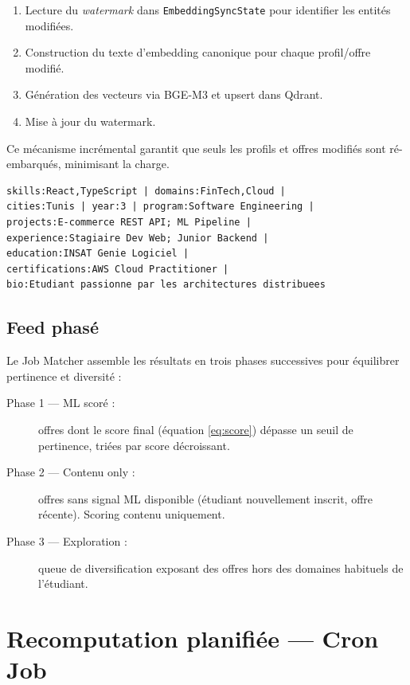 ﻿\documentclass[12pt,a4paper]{report}
\begin{document}
\begin{enumerate}
  \item Lecture du \textit{watermark} dans \texttt{EmbeddingSyncState} pour identifier les entités modifiées.
  \item Construction du texte d'embedding canonique pour chaque profil/offre modifié.
  \item Génération des vecteurs via BGE-M3 et upsert dans Qdrant.
  \item Mise à jour du watermark.
\end{enumerate}

Ce mécanisme incrémental garantit que seuls les profils et offres modifiés sont ré-embarqués, minimisant la charge.

\begin{lstlisting}[style=bash, caption={Format canonique du texte d'embedding étudiant}]
skills:React,TypeScript | domains:FinTech,Cloud |
cities:Tunis | year:3 | program:Software Engineering |
projects:E-commerce REST API; ML Pipeline |
experience:Stagiaire Dev Web; Junior Backend |
education:INSAT Genie Logiciel |
certifications:AWS Cloud Practitioner |
bio:Etudiant passionne par les architectures distribuees
\end{lstlisting}

\subsection{Feed phasé}

Le Job Matcher assemble les résultats en trois phases successives pour équilibrer pertinence et diversité :

\begin{description}
  \item[Phase 1 — ML scoré :] offres dont le score final (équation \ref{eq:score}) dépasse un seuil de pertinence, triées par score décroissant.
  \item[Phase 2 — Contenu only :] offres sans signal ML disponible (étudiant nouvellement inscrit, offre récente). Scoring contenu uniquement.
  \item[Phase 3 — Exploration :] queue de diversification exposant des offres hors des domaines habituels de l'étudiant.
\end{description}

\section{Recomputation planifiée — Cron Job}
\end{document}
